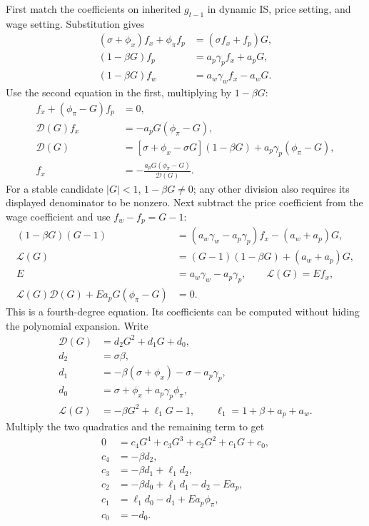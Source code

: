 First match the coefficients on inherited $g_{t-1}$ in dynamic IS, price
setting, and wage setting. Substitution gives
\begin{align}
 (\sigma+\phi_x)f_x+\phi_\pi f_p&=(\sigma f_x+f_p)G,\\
 (1-\beta G)f_p&=a_p\gamma_pf_x+a_pG,\\
 (1-\beta G)f_w&=a_w\gamma_wf_x-a_wG.
\end{align}
Use the second equation in the first, multiplying by $1-\beta G$:
\begin{align}
 [(\sigma+\phi_x)-\sigma G]f_x+(\phi_\pi-G)f_p&=0,\\
 \mathcal D(G)f_x&=-a_pG(\phi_\pi-G),\\
 \mathcal D(G)
 &=[\sigma+\phi_x-\sigma G](1-\beta G)
                         +a_p\gamma_p(\phi_\pi-G),\\
 f_x&=-\frac{a_pG(\phi_\pi-G)}{\mathcal D(G)}.
\end{align}
For a stable candidate $|G|<1$, $1-\beta G\ne0$; any other division also
requires its displayed denominator to be nonzero. Next subtract the price
coefficient from the wage coefficient and use $f_w-f_p=G-1$:
\begin{align}
 (1-\beta G)(G-1)
 &=(a_w\gamma_w-a_p\gamma_p)f_x-(a_w+a_p)G,\\
 \mathcal L(G)&=(G-1)(1-\beta G)+(a_w+a_p)G,\\
 E&=a_w\gamma_w-a_p\gamma_p,\qquad
 \mathcal L(G)=E f_x,\\
 \mathcal L(G)\mathcal D(G)+Ea_pG(\phi_\pi-G)&=0.
 \label{eq:sw-state-polynomial}
\end{align}
This is a fourth-degree equation. Its coefficients can be computed without
hiding the polynomial expansion. Write
\begin{align}
 \mathcal D(G)&=d_2G^2+d_1G+d_0,\\
 d_2&=\sigma\beta,\\
 d_1&=-\beta(\sigma+\phi_x)-\sigma-a_p\gamma_p,\\
 d_0&=\sigma+\phi_x+a_p\gamma_p\phi_\pi,\\
 \mathcal L(G)&=-\beta G^2+\ell_1G-1,\qquad
 \ell_1=1+\beta+a_p+a_w.
\end{align}
Multiply the two quadratics and the remaining term to get
\begin{align}
 0&=c_4G^4+c_3G^3+c_2G^2+c_1G+c_0,\\
 c_4&=-\beta d_2,\\
 c_3&=-\beta d_1+\ell_1d_2,\\
 c_2&=-\beta d_0+\ell_1d_1-d_2-Ea_p,\\
 c_1&=\ell_1d_0-d_1+Ea_p\phi_\pi,\\
 c_0&=-d_0.
\end{align}
